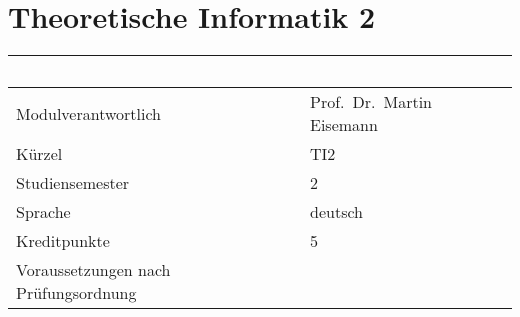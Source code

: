 \chapter{Theoretische Informatik 2}\label{theoretische-informatik-2}

\begin{longtable}[]{@{}ll@{}}
\toprule
\begin{minipage}[b]{0.12\columnwidth}\raggedright\strut
~\strut
\end{minipage} & \begin{minipage}[b]{0.12\columnwidth}\raggedright\strut
~\strut
\end{minipage}\tabularnewline
\midrule
\endhead
\begin{minipage}[t]{0.12\columnwidth}\raggedright\strut
Modulverantwortlich\strut
\end{minipage} & \begin{minipage}[t]{0.12\columnwidth}\raggedright\strut
Prof.~Dr.~Martin Eisemann\strut
\end{minipage}\tabularnewline
\begin{minipage}[t]{0.12\columnwidth}\raggedright\strut
Kürzel\strut
\end{minipage} & \begin{minipage}[t]{0.12\columnwidth}\raggedright\strut
TI2\strut
\end{minipage}\tabularnewline
\begin{minipage}[t]{0.12\columnwidth}\raggedright\strut
Studiensemester\strut
\end{minipage} & \begin{minipage}[t]{0.12\columnwidth}\raggedright\strut
2\strut
\end{minipage}\tabularnewline
\begin{minipage}[t]{0.12\columnwidth}\raggedright\strut
Sprache\strut
\end{minipage} & \begin{minipage}[t]{0.12\columnwidth}\raggedright\strut
deutsch\strut
\end{minipage}\tabularnewline
\begin{minipage}[t]{0.12\columnwidth}\raggedright\strut
Kreditpunkte\strut
\end{minipage} & \begin{minipage}[t]{0.12\columnwidth}\raggedright\strut
5\strut
\end{minipage}\tabularnewline
\begin{minipage}[t]{0.12\columnwidth}\raggedright\strut
Voraussetzungen nach Prüfungsordnung\strut

\end{minipage}
\end{longtable}
